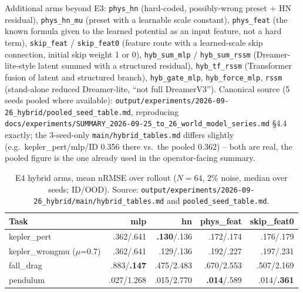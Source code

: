 \documentclass[11pt]{article}
\newcommand{\srcpath}[1]{\texttt{\small #1}}
\begin{document}
Additional arms beyond E3: \texttt{phys\_hn} (hard-coded, possibly-wrong preset $+$ HN residual),
\texttt{phys\_hn\_mu} (preset with a learnable scale constant), \texttt{phys\_feat} (the known
formula given to the learned potential as an input feature, not a hard term), \texttt{skip\_feat} /
\texttt{skip\_feat0} (feature route with a learned-scale skip connection, initial skip weight 1 or
0), \texttt{hyb\_sum\_mlp} / \texttt{hyb\_sum\_rssm} (Dreamer-lite-style latent summed with a
structured residual), \texttt{hyb\_tf\_rssm} (Transformer fusion of latent and structured branch),
\texttt{hyb\_gate\_mlp}, \texttt{hyb\_force\_mlp}, \texttt{rssm} (stand-alone reduced Dreamer-lite,
``not full DreamerV3''). Canonical source (5 seeds pooled where available):
\srcpath{output/experiments/2026-09-26\_hybrid/pooled\_seed\_table.md}, reproducing
\srcpath{docs/experiments/SUMMARY\_2026-09-25\_to\_26\_world\_model\_series.md} \S4.4 exactly; the
3-seed-only \srcpath{main/hybrid\_tables.md} differs slightly (e.g.\ kepler\_pert/mlp/ID 0.356 there
vs.\ the pooled 0.362) -- both are real, the pooled figure is the one already used in the
operator-facing summary.

\begin{table}[h]
\centering
\small
\caption{E4 hybrid arms, mean nRMSE over rollout ($N=64$, 2\% noise, median over seeds; ID/OOD). Source: \srcpath{output/experiments/2026-09-26\_hybrid/main/hybrid\_tables.md} and \srcpath{pooled\_seed\_table.md}.}
\begin{tabular}{lrrrr}
\toprule
Task & mlp & hn & phys\_feat & skip\_feat0 \\
\midrule
kepler\_pert & .362/.641 & \textbf{.130}/.136 & .172/.174 & .176/.179 \\
kepler\_wrongmu ($\mu$=0.7) & .362/.641 & .129/.136 & .192/.227 & .197/.231 \\
fall\_drag & .883/\textbf{.147} & .475/2.483 & .670/2.553 & .507/2.169 \\
pendulum & .027/1.268 & .015/2.770 & \textbf{.014}/.589 & .014/\textbf{.361} \\
\bottomrule
\end{tabular}
\end{table}
\end{document}
